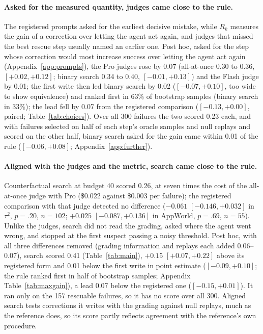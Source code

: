 \documentclass[11pt]{article}
\begin{document}
\paragraph{Asked for the measured quantity, judges came close to the rule.} The registered prompts asked for the earliest decisive mistake, while $R_k$ measures the gain of a correction over letting the agent act again, and judges that missed the best rescue step usually named an earlier one. Post hoc, asked for the step whose correction would most increase success over letting the agent act again (Appendix~\ref{app:prompts}), the Pro judges rose by 0.07 (all-at-once 0.30 to 0.36, $[+0.02,+0.12]$; binary search 0.34 to 0.40, $[-0.01,+0.13]$) and the Flash judge by 0.01; the first write then led binary search by 0.02 ($[-0.07,+0.10]$, too wide to show equivalence) and ranked first in 63\% of bootstrap samples (binary search in 33\%); the lead fell by 0.07 from the registered comparison ($[-0.13,+0.00]$, paired; Table~\ref{tab:choices}). Over all 300 failures the two scored 0.23 each, and with failures selected on half of each step's oracle samples and null replays and scored on the other half, binary search asked for the gain came within 0.01 of the rule ($[-0.06,+0.08]$; Appendix~\ref{app:further}).

\paragraph{Aligned with the judges and the metric, search came close to the rule.} Counterfactual search at budget 40 scored 0.26, at seven times the cost of the all-at-once judge with Pro (\$0.022 against \$0.003 per failure); the registered comparison with that judge detected no difference ($-0.061$ $[-0.146,+0.032]$ in $\tau^2$, $p=.20$, $n=102$; $+0.025$ $[-0.087,+0.136]$ in AppWorld, $p=.69$, $n=55$). Unlike the judges, search did not read the grading, asked where the agent went wrong, and stopped at the first suspect passing a noisy threshold. Post hoc, with all three differences removed (grading information and replays each added 0.06--0.07), search scored 0.41 (Table~\ref{tab:main}), $+0.15$ $[+0.07,+0.22]$ above its registered form and 0.01 below the first write in point estimate ($[-0.09,+0.10]$; the rule ranked first in half of bootstrap samples; Appendix Table~\ref{tab:maxgain}), a lead 0.07 below the registered one ($[-0.15,+0.01]$). It ran only on the 157 rescuable failures, so it has no score over all 300. Aligned search tests corrections it writes with the grading against null replays, much as the reference does, so its score partly reflects agreement with the reference's own procedure.
\end{document}
